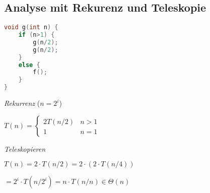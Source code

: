 \vspace{-4pt}
\begin{sectionbox}
\subsection{Analyse mit Rekurenz und Teleskopie}\par\smallskip
\begin{lstlisting}[language=c++]
void g(int n) {
    if (n>1) {
        g(n/2);
        g(n/2);
    }
    else {
        f();
    }
}
\end{lstlisting}\vspace{-4px}
\textit{Rekurrenz} ($n=2^{i}$)\par
$T(n)=\left\{\begin{array}{ll}2 T(n / 2) & n>1 \\ 1 & n=1\end{array}\right.$\par\smallskip
\textit{Teleskopieren}\par
$T(n)=2 \cdot T(n / 2) = 2 \cdot (2 \cdot T(n / 4)) $ \par
$= 2^{i} \cdot T(n/2^{i}) = n \cdot T(n/n) \in \Theta(n)$\par\smallskip

\end{sectionbox}